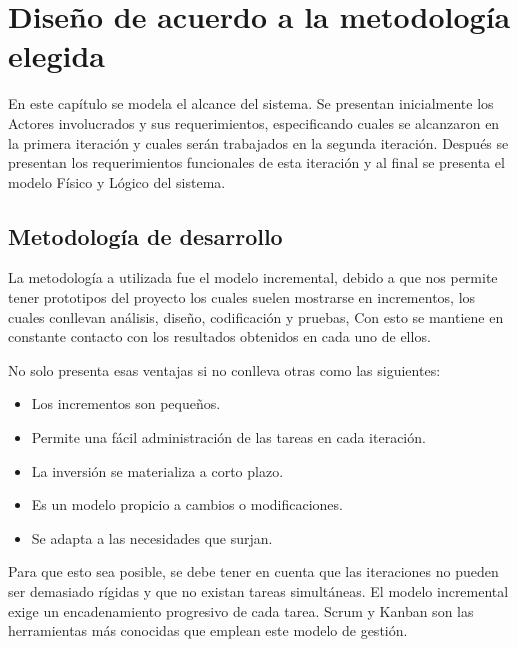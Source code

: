 \chapter{Diseño de acuerdo a la metodología elegida}
\label{cap:reqUsr}

	En este capítulo se modela el alcance del sistema. Se presentan inicialmente los Actores involucrados y sus requerimientos, especificando cuales se alcanzaron en la primera iteración y cuales serán trabajados en la segunda iteración. Después se presentan los requerimientos funcionales de esta iteración y al final se presenta el modelo Físico y Lógico del sistema.


\section{Metodología de desarrollo} 
La metodología a utilizada fue el modelo incremental, debido a que nos permite tener prototipos del proyecto los cuales suelen mostrarse en incrementos, los cuales conllevan análisis, diseño, codificación y pruebas, Con esto se mantiene en constante contacto con los resultados obtenidos en cada uno de ellos. 
 
No solo presenta esas ventajas si no conlleva otras como las siguientes: 

\begin{itemize}
\item Los incrementos son pequeños. 

\item Permite una fácil administración de las tareas en cada iteración. 

\item La inversión se materializa a corto plazo. 

\item Es un modelo propicio a cambios o modificaciones. 

\item Se adapta a las necesidades que surjan. 
\end{itemize}

Para que esto sea posible, se debe tener en cuenta que las iteraciones no pueden ser demasiado rígidas y que no existan tareas simultáneas. El modelo incremental exige un encadenamiento progresivo de cada tarea. Scrum y Kanban son las herramientas más conocidas que emplean este modelo de gestión. \cite{GrandesErrores}


